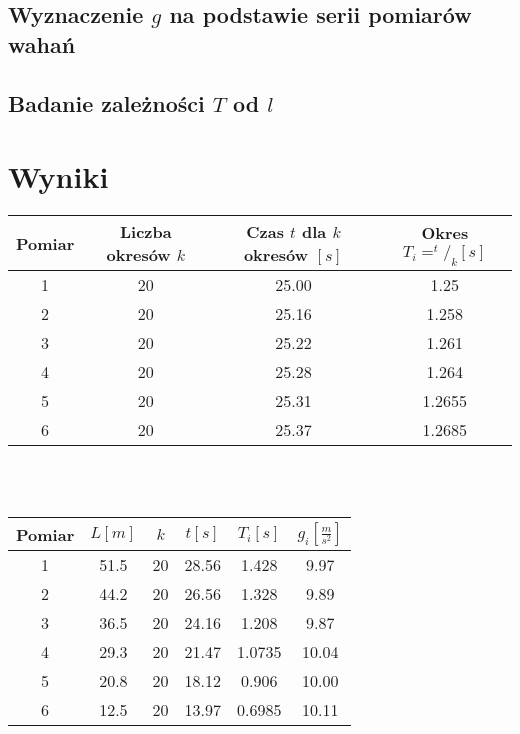 \documentclass[11pt]{article}
\begin{document}
\subsection{Wyznaczenie $g$ na podstawie serii pomiarów wahań}
\subsection{Badanie zależności $T$ od $l$}

\section{Wyniki}
\begin{minipage}{\linewidth}
\centering
{} \label{tab:title} 
\begin{tabular}{c | c | c | c}
	Pomiar & Liczba okresów $k$ & Czas $t$ dla $k$ okresów $[s]$ & Okres $T_i = ^t/_k [s]$\\ \hline
	1 & 20 & 25.00 & 1.25\\
	2 & 20 & 25.16 & 1.258\\
	3 & 20 & 25.22 & 1.261\\
	4 & 20 & 25.28 & 1.264\\
	5 & 20 & 25.31 & 1.2655\\
	6 & 20 & 25.37 & 1.2685\\
\end{tabular}\par
\end{minipage}
\\
\\
\begin{minipage}{\linewidth}
\centering
{} \label{tab:title} 
\begin{tabular}{c | c | c | c | c | c}
	Pomiar & $L [m]$ & $k$  & $t [s]$ & $T_i [s] $ & $g_i [\frac{m}{s^2}]$\\ \hline
	1 & 51.5 & 20 & 28.56 & 1.428 & 9.97\\
	2 & 44.2 & 20 & 26.56 & 1.328 & 9.89\\
	3 & 36.5 & 20 & 24.16 & 1.208 & 9.87\\
	4 & 29.3 & 20 & 21.47 & 1.0735 & 10.04\\
	5 & 20.8 & 20 & 18.12 & 0.906 & 10.00\\
	6 & 12.5 & 20 & 13.97 & 0.6985 & 10.11\\
\end{tabular}\par
\end{minipage}
\end{document}
